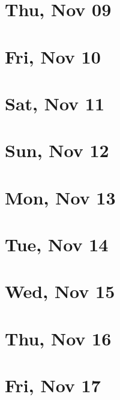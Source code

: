 	\section{Thu, Nov 09}
		
		
	\section{Fri, Nov 10}
		
		
	\section{Sat, Nov 11}
		
		
	\section{Sun, Nov 12}
		
		
	\section{Mon, Nov 13}
		
		
	\section{Tue, Nov 14}
		
		
	\section{Wed, Nov 15}
		
		
	\section{Thu, Nov 16}
		
		
	\section{Fri, Nov 17}
		
		
